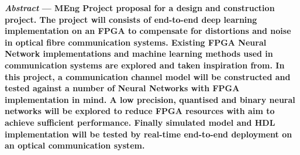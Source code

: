 
\iffalse

This is the most important paragraph in the entire proposal. 
It is a snapshot of the proposed work. 
It is a concise summary of what is intended to be accomplished and gives a short indication of what has appeared in the literature before you start your work.

Keep it about 300 words (under one page).
The Abstract is written last, after the entire proposal has been written

\fi

\textbf{\textit{Abstract} --- MEng Project proposal for a design and construction project. The project will consists of end-to-end deep learning implementation on an FPGA to compensate for distortions and noise in optical fibre communication systems. Existing FPGA Neural Network implementations and machine learning methods used in communication systems are explored and taken inspiration from. In this project, a communication channel model will be constructed and tested against a number of Neural Networks with FPGA implementation in mind. A low precision, quantised and binary neural networks will be explored to reduce FPGA resources with aim to achieve sufficient performance. Finally simulated model and HDL implementation will be tested by real-time end-to-end deployment on an optical communication system.}